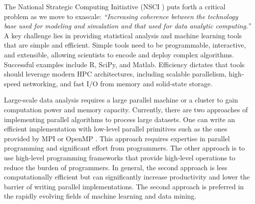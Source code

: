 
The National Strategic Computing Initiative (NSCI \cite{NSCI}) puts forth a critical
problem as we move to exascale: {\em ``Increasing coherence between the technology base used for 
modeling and simulation and that used for data analytic computing.''}  
A key challenge lies in providing statistical analysis and machine learning 
tools that are simple and efficient.
Simple tools need to be programmable, interactive, and extensible, 
allowing scientists to encode and deploy complex algorithms. 
Successful examples include R, SciPy, and Matlab.  Efficiency dictates that tools should 
leverage modern HPC architectures, including scalable parallelism, high-speed networking,
and fast I/O from memory and solid-state storage.




Large-scale data analysis requires a large parallel machine or a cluster to
gain computation power and memory capacity. Currently,
there are two approaches of implementing parallel algorithms to process large
datasets. One can write an efficient implementation with low-level parallel
primitives such as the ones provided by MPI \cite{mpi} or OpenMP \cite{openmp}.
This approach requires expertise in parallel programming and significant
effort from programmers. The other approach is to use high-level programming
frameworks that provide high-level operations to reduce the burden of
programmers. In general, the second approach is less computationally
efficient but can significantly increase productivity and lower the barrier
of writing parallel implementations. The second approach is 
preferred in the rapidly evolving fields of machine learning and data mining.

